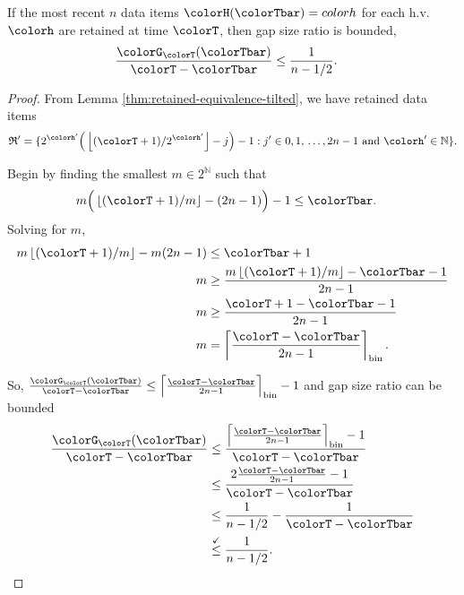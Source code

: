\begin{lemma}
\label{thm:gap-size-ratio-tilted}
If the most recent $n$ data items $\colorH(\colorTbar) = colorh$ for each h.v. $\colorh$ are retained at time $\colorT$, then gap size ratio is bounded,
\begin{align*}
\frac{\colorG_{\colorT}(\colorTbar)}{\colorT - \colorTbar}
&\leq
\frac{1}{n - 1/2}.
\end{align*}
\end{lemma}
\begin{proof}

From Lemma \ref{thm:retained-equivalence-tilted}, we have retained data items
\begin{align*}
\mathfrak{R}' =
\{
2^{\colorh'}\Big(\left\lfloor (\colorT + 1) / 2^{\colorh'} \right\rfloor - j\Big) - 1
  :
  j' \in 0,1,\,\ldots,2n-1
  \text{ and }
  \colorh' \in \mathbb{N}
\}.
\end{align*}

Begin by finding the smallest $m \in 2^{\mathbb{N}}$ such that
\begin{align*}
m\Big( \left\lfloor (\colorT + 1)/m \right\rfloor - (2n - 1)\Big) - 1
&\leq
\colorTbar.
\end{align*}
Solving for $m$,
\begin{align*}
m \left\lfloor (\colorT + 1)/m \right\rfloor - m(2n - 1)
&\leq \colorTbar + 1\\
m
&\geq \frac{
m \left\lfloor (\colorT + 1)/m \right\rfloor - \colorTbar - 1
}{2n - 1}\\
m
&\geq \frac{
\colorT + 1 - \colorTbar - 1
}{2n - 1}\\
m
&= \left\lceil \frac{\colorT - \colorTbar}{2n - 1} \right\rceil_{\mathrm{bin}}.
\end{align*}

So, $\frac{\colorG_{\colorT}(\colorTbar)}{\colorT - \colorTbar} \leq \left\lceil \frac{\colorT - \colorTbar}{2n - 1} \right\rceil_{\mathrm{bin}} - 1$ and gap size ratio can be bounded
\begin{align*}
\frac{\colorG_{\colorT}(\colorTbar)}{\colorT - \colorTbar}
&\leq
\frac{
\left\lceil \frac{\colorT - \colorTbar}{2n - 1} \right\rceil_{\mathrm{bin}} - 1
}{
\colorT - \colorTbar
}\\
&\leq
\frac{
2\frac{\colorT - \colorTbar}{2n - 1}
 - 1
}{
\colorT - \colorTbar
}\\
&\leq
\frac{1
}{n - 1/2}
-
\frac{1
}{
\colorT - \colorTbar
}\\
&\stackrel{\checkmark}{\leq}
\frac{1}{n - 1/2}.
\end{align*}

\end{proof}
